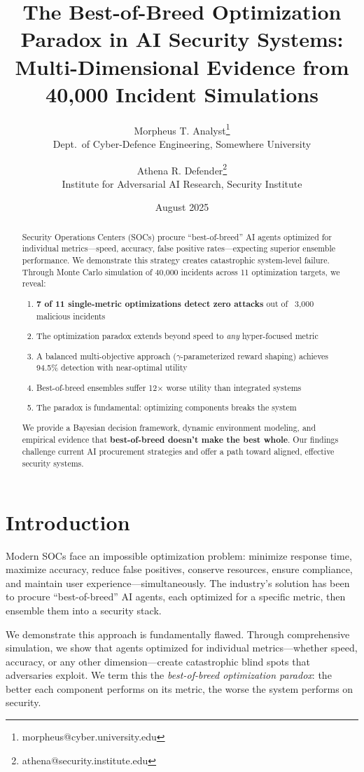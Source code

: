 \documentclass[11pt]{article}
\title{\bfseries
The Best-of-Breed Optimization Paradox in AI Security Systems:\\
Multi-Dimensional Evidence from 40,000 Incident Simulations
}
\author{
Morpheus T. Analyst\thanks{morpheus@cyber.university.edu}\\
\small Dept.\ of Cyber-Defence Engineering, Somewhere University
\and
Athena R. Defender\thanks{athena@security.institute.edu}\\
\small Institute for Adversarial AI Research, Security Institute
}
\date{August 2025}
\begin{document}
\maketitle\vspace{-1.5em}

\begin{abstract}
Security Operations Centers (SOCs) procure ``best-of-breed'' AI agents optimized for individual metrics—speed, accuracy, false positive rates—expecting superior ensemble performance. We demonstrate this strategy creates catastrophic system-level failure. Through Monte Carlo simulation of 40,000 incidents across 11 optimization targets, we reveal:
\begin{enumerate}
\item \textbf{7 of 11 single-metric optimizations detect zero attacks} out of ~3,000 malicious incidents
\item The optimization paradox extends beyond speed to \emph{any} hyper-focused metric
\item A balanced multi-objective approach ($\gamma$-parameterized reward shaping) achieves 94.5\% detection with near-optimal utility
\item Best-of-breed ensembles suffer 12× worse utility than integrated systems
\item The paradox is fundamental: optimizing components breaks the system
\end{enumerate}
We provide a Bayesian decision framework, dynamic environment modeling, and empirical evidence that \textbf{best-of-breed doesn't make the best whole}. Our findings challenge current AI procurement strategies and offer a path toward aligned, effective security systems.
\end{abstract}

\section{Introduction}
\label{sec:intro}

Modern SOCs face an impossible optimization problem: minimize response time, maximize accuracy, reduce false positives, conserve resources, ensure compliance, and maintain user experience—simultaneously. The industry's solution has been to procure ``best-of-breed'' AI agents, each optimized for a specific metric, then ensemble them into a security stack.

We demonstrate this approach is fundamentally flawed. Through comprehensive simulation, we show that agents optimized for individual metrics—whether speed, accuracy, or any other dimension—create catastrophic blind spots that adversaries exploit. We term this the \emph{best-of-breed optimization paradox}: the better each component performs on its metric, the worse the system performs on security.
\end{document}
